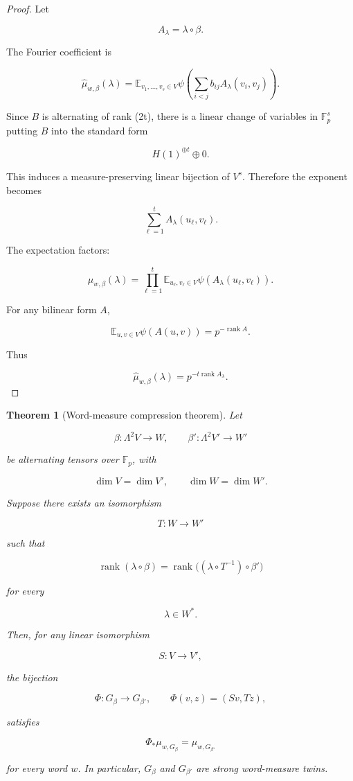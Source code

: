 \documentclass[11pt]{article}
\newtheorem{theorem}{Theorem}[section]
\begin{document}
\begin{proof}
Let

\[
A_\lambda=\lambda\circ\beta.
\]

The Fourier coefficient is

\[
\widehat\mu_{w,\beta}(\lambda)
=\mathbb E_{v_1,\ldots,v_s\in V}
\psi\left(
\sum_{i<j}b_{ij}A_\lambda(v_i,v_j)
\right).
\]

Since $B$ is alternating of rank (2t), there is a linear change of variables in $\mathbb F_p^s$ putting $B$ into the standard form

\[
H(1)^{\oplus t}\oplus0.
\]

This induces a measure-preserving linear bijection of $V^s$. Therefore the exponent becomes

\[
\sum_{\ell=1}^t A_\lambda(u_\ell,v_\ell).
\]

The expectation factors:

\[
\widehat\mu_{w,\beta}(\lambda)
=\prod_{\ell=1}^t
\mathbb E_{u_\ell,v_\ell\in V}
\psi(A_\lambda(u_\ell,v_\ell)).
\]

For any bilinear form $A$,

\[
\mathbb E_{u,v\in V}\psi(A(u,v))
=p^{-\operatorname{rank}A}.
\]

Thus

\[
\widehat\mu_{w,\beta}(\lambda)
=p^{-t\operatorname{rank} A_\lambda}.
\]

\end{proof}

\begin{theorem}[Word-measure compression theorem]
Let

\[
\beta:\Lambda^2V\to W,
\qquad
\beta':\Lambda^2V'\to W'
\]

be alternating tensors over $\mathbb F_p$, with

\[
\dim V=\dim V',
\qquad
\dim W=\dim W'.
\]

Suppose there exists an isomorphism

\[
T:W\to W'
\]

such that

\[
\operatorname{rank}(\lambda\circ\beta)
=\operatorname{rank}\bigl((\lambda\circ T^{-1})\circ\beta'\bigr)
\]

for every

\[
\lambda\in W^*.
\]

Then, for any linear isomorphism

\[
S:V\to V',
\]

the bijection

\[
\Phi:G_\beta\to G_{\beta'},
\qquad
\Phi(v,z)=(Sv,Tz),
\]

satisfies

\[
\Phi_*\mu_{w,G_\beta}
=\mu_{w,G_{\beta'}}
\]

for every word $w$. In particular, $G_\beta$ and $G_{\beta'}$ are strong word-measure twins.

\end{theorem}
\end{document}
